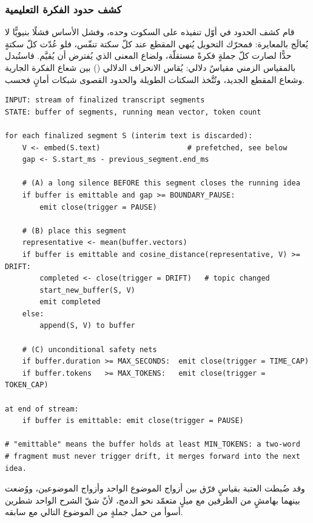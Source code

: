 \subsubsection{كشف حدود الفكرة التعليمية}

قام كشف الحدود في أوّل تنفيذه على السكوت وحده، وفشل الأساس فشلًا بنيويًّا لا يُعالَج بالمعايرة: فمحرّك التحويل يُنهي المقطع عند كلّ سكتة تنفّس، فلو عُدّت كلّ سكتةٍ حدًّا لصارت كلّ جملةٍ فكرةً مستقلّة، ولضاع المعنى الذي يُفترض أن يُقيَّم. فاستُبدل بالمقياس الزمني مقياسٌ دلالي: يُقاس الانحراف الدلالي () بين شعاع الفكرة الجارية وشعاع المقطع الجديد، وتُتَّخذ السكتات الطويلة والحدود القصوى شبكات أمانٍ فحسب.

\begin{english}
\begin{lstlisting}[caption={},captionpos=b]
INPUT: stream of finalized transcript segments
STATE: buffer of segments, running mean vector, token count

for each finalized segment S (interim text is discarded):
    V <- embed(S.text)                    # prefetched, see below
    gap <- S.start_ms - previous_segment.end_ms

    # (A) a long silence BEFORE this segment closes the running idea
    if buffer is emittable and gap >= BOUNDARY_PAUSE:
        emit close(trigger = PAUSE)

    # (B) place this segment
    representative <- mean(buffer.vectors)
    if buffer is emittable and cosine_distance(representative, V) >= DRIFT:
        completed <- close(trigger = DRIFT)   # topic changed
        start_new_buffer(S, V)
        emit completed
    else:
        append(S, V) to buffer

    # (C) unconditional safety nets
    if buffer.duration >= MAX_SECONDS:  emit close(trigger = TIME_CAP)
    if buffer.tokens   >= MAX_TOKENS:   emit close(trigger = TOKEN_CAP)

at end of stream:
    if buffer is emittable: emit close(trigger = PAUSE)

# "emittable" means the buffer holds at least MIN_TOKENS: a two-word
# fragment must never trigger drift, it merges forward into the next idea.
\end{lstlisting}
\end{english}

وقد ضُبطت العتبة بقياسٍ فرّق بين أزواج الموضوع الواحد وأزواج الموضوعين، ووُضعت بينهما بهامشٍ من الطرفين مع ميلٍ متعمّد نحو الدمج، لأنّ شقّ الشرح الواحد شطرين أسوأ من حمل جملةٍ من الموضوع التالي مع سابقه.

